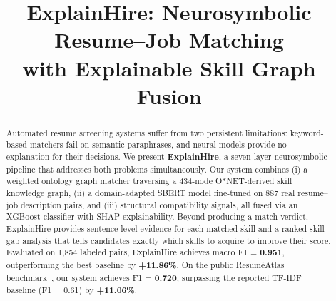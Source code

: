 \documentclass[conference]{IEEEtran}
\begin{document}
\title{ExplainHire: Neurosymbolic Resume--Job Matching\\
with Explainable Skill Graph Fusion}

\author{
  \and
  \and
  \and
}

\maketitle

\begin{abstract}
Automated resume screening systems suffer from two persistent limitations:
keyword-based matchers fail on semantic paraphrases, and neural models
provide no explanation for their decisions. We present \textbf{ExplainHire},
a seven-layer neurosymbolic pipeline that addresses both problems
simultaneously. Our system combines (i) a weighted ontology graph matcher
traversing a 434-node O*NET-derived skill knowledge graph, (ii) a
domain-adapted SBERT model fine-tuned on 887 real resume--job description
pairs, and (iii) structural compatibility signals, all fused via an XGBoost
classifier with SHAP explainability. Beyond producing a match verdict,
ExplainHire provides sentence-level evidence for each matched skill and a
ranked skill gap analysis that tells candidates exactly which skills to
acquire to improve their score. Evaluated on 1,854 labeled pairs, ExplainHire
achieves macro F1 = \textbf{0.951}, outperforming the best baseline by
\textbf{+11.86\%}. On the public ResuméAtlas benchmark~\cite{heakl2024resumeatlas},
our system achieves F1 = \textbf{0.720}, surpassing the reported TF-IDF
baseline (F1 = 0.61) by \textbf{+11.06\%}.
\end{abstract}
\end{document}
